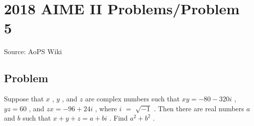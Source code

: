 \documentclass[12pt]{article}
\begin{document}
\section*{{2018 AIME II Problems/Problem 5}}
Source: AoPS Wiki

\subsection*{Problem}
Suppose that $x$ , $y$ , and $z$ are complex numbers such that $xy = -80 - 320i$ , $yz = 60$ , and $zx = -96 + 24i$ , where $i$ $=$ $\sqrt{-1}$ . Then there are real numbers $a$ and $b$ such that $x + y + z = a + bi$ . Find $a^2 + b^2$ .
\end{document}

